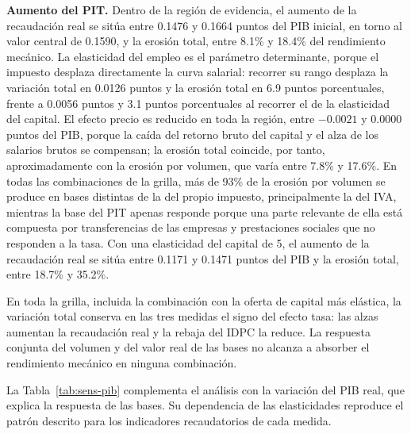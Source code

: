 \documentclass[11pt]{article}
\begin{document}
\textbf{Aumento del PIT.} Dentro de la región de evidencia, el aumento de la recaudación real se sitúa entre 0.1476 y 0.1664 puntos del PIB inicial, en torno al valor central de 0.1590, y la erosión total, entre 8.1\% y 18.4\% del rendimiento mecánico. La elasticidad del empleo es el parámetro determinante, porque el impuesto desplaza directamente la curva salarial: recorrer su rango desplaza la variación total en 0.0126 puntos y la erosión total en 6.9 puntos porcentuales, frente a 0.0056 puntos y 3.1 puntos porcentuales al recorrer el de la elasticidad del capital. El efecto precio es reducido en toda la región, entre $-0.0021$ y 0.0000 puntos del PIB, porque la caída del retorno bruto del capital y el alza de los salarios brutos se compensan; la erosión total coincide, por tanto, aproximadamente con la erosión por volumen, que varía entre 7.8\% y 17.6\%. En todas las combinaciones de la grilla, más de 93\% de la erosión por volumen se produce en bases distintas de la del propio impuesto, principalmente la del IVA, mientras la base del PIT apenas responde porque una parte relevante de ella está compuesta por transferencias de las empresas y prestaciones sociales que no responden a la tasa. Con una elasticidad del capital de 5, el aumento de la recaudación real se sitúa entre 0.1171 y 0.1471 puntos del PIB y la erosión total, entre 18.7\% y 35.2\%.

En toda la grilla, incluida la combinación con la oferta de capital más elástica, la variación total conserva en las tres medidas el signo del efecto tasa: las alzas aumentan la recaudación real y la rebaja del IDPC la reduce. La respuesta conjunta del volumen y del valor real de las bases no alcanza a absorber el rendimiento mecánico en ninguna combinación.

La Tabla~\ref{tab:sens-pib} complementa el análisis con la variación del PIB real, que explica la respuesta de las bases. Su dependencia de las elasticidades reproduce el patrón descrito para los indicadores recaudatorios de cada medida.
\end{document}
